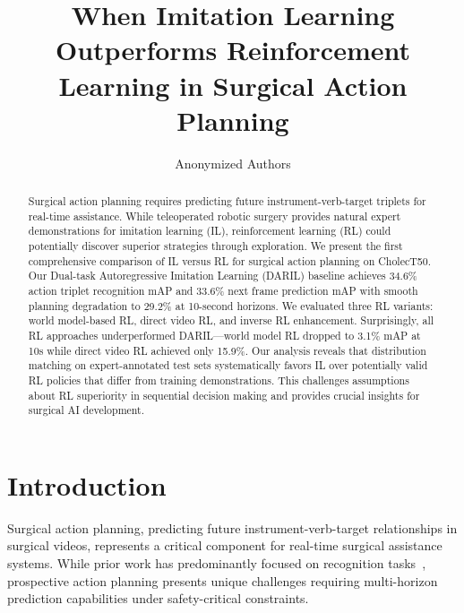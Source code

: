 \documentclass[runningheads]{llncs}
\begin{document}
%
\title{When Imitation Learning Outperforms Reinforcement Learning in Surgical Action Planning}
%
\author{Anonymized Authors}

\maketitle
%
\begin{abstract}
Surgical action planning requires predicting future instrument-verb-target triplets for real-time assistance. While teleoperated robotic surgery provides natural expert demonstrations for imitation learning (IL), reinforcement learning (RL) could potentially discover superior strategies through exploration. We present the first comprehensive comparison of IL versus RL for surgical action planning on CholecT50. Our Dual-task Autoregressive Imitation Learning (DARIL) baseline achieves 34.6\% action triplet recognition mAP and 33.6\% next frame prediction mAP with smooth planning degradation to 29.2\% at 10-second horizons. We evaluated three RL variants: world model-based RL, direct video RL, and inverse RL enhancement. Surprisingly, all RL approaches underperformed DARIL—world model RL dropped to 3.1\% mAP at 10s while direct video RL achieved only 15.9\%. Our analysis reveals that distribution matching on expert-annotated test sets systematically favors IL over potentially valid RL policies that differ from training demonstrations. This challenges assumptions about RL superiority in sequential decision making and provides crucial insights for surgical AI development.

\end{abstract}

\section{Introduction}

Surgical action planning, predicting future instrument-verb-target relationships in surgical videos, represents a critical component for real-time surgical assistance systems. While prior work has predominantly focused on recognition tasks~\cite{nwoye2022cholect50,nwoye2020recognition,nwoye2023cholectriplet2021}, prospective action planning presents unique challenges requiring multi-horizon prediction capabilities under safety-critical constraints.
\end{document}
